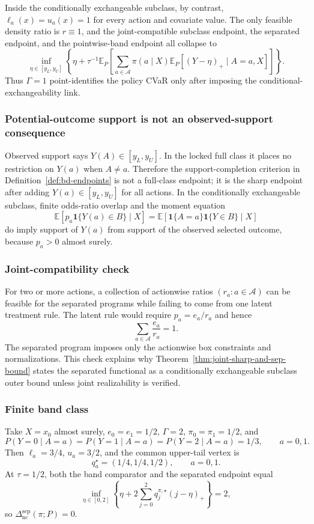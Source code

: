 \documentclass[11pt]{article}
\newcommand{\E}{\mathbb{E}}
\newcommand{\one}{\mathbf{1}}
\theoremstyle{definition}
\theoremstyle{plain}
\theoremstyle{remark}
\begin{document}
Inside the conditionally exchangeable subclass, by contrast,
\(\ell_a(x)=u_a(x)=1\) for every action and covariate value.  The only feasible
density ratio is \(r\equiv1\), and the joint-compatible subclass endpoint, the
separated endpoint, and the pointwise-band endpoint all collapse to
\[
\inf_{\eta\in[y_L,y_U]}
\left\{
\eta+\tau^{-1}
\E_P\left[
\sum_{a\in\mathcal A}\pi(a\mid X)
\E_P[(Y-\eta)_+\mid A=a,X]
\right]\right\}.
\]
Thus \(\Gamma=1\) point-identifies the policy CVaR only after imposing the
conditional-exchangeability link.

\subsubsection*{Potential-outcome support is not an observed-support consequence}
Observed support says \(Y(A)\in[y_L,y_U]\).  In the locked full class it places
no restriction on \(Y(a)\) when \(A\ne a\).  Therefore the support-completion
criterion in Definition~\ref{def:bd-endpoints} is not a full-class endpoint; it
is the sharp endpoint after adding
\(Y(a)\in[y_L,y_U]\) for all actions.  In the conditionally exchangeable
subclass, finite odds-ratio overlap and the moment equation
\[
\E[p_a\one\{Y(a)\in B\}\mid X]
=
\E[\one\{A=a\}\one\{Y\in B\}\mid X]
\]
do imply support of \(Y(a)\) from support of the observed selected outcome,
because \(p_a>0\) almost surely.

\subsubsection*{Joint-compatibility check}
For two or more actions, a collection of actionwise ratios
\((r_a:a\in\mathcal A)\) can be feasible for the separated programs while
failing to come from one latent treatment rule.  The latent rule would require
\(p_a=e_a/r_a\) and hence
\[
\sum_{a\in\mathcal A}\frac{e_a}{r_a}=1.
\]
The separated program imposes only the actionwise box constraints and
normalizations.  This check explains why
Theorem~\ref{thm:joint-sharp-and-sep-bound} states the separated functional as a
conditionally exchangeable subclass outer bound unless joint realizability is
verified.

\subsubsection*{Finite band class}
Take \(X=x_0\) almost surely, \(e_0=e_1=1/2\), \(\Gamma=2\),
\(\pi_0=\pi_1=1/2\), and
\[
P(Y=0\mid A=a)=P(Y=1\mid A=a)=P(Y=2\mid A=a)=1/3,\qquad a=0,1.
\]
Then \(\ell_a=3/4\), \(u_a=3/2\), and the common upper-tail vertex is
\[
q_a^\star=(1/4,1/4,1/2),\qquad a=0,1.
\]
At \(\tau=1/2\), both the band comparator and the separated endpoint equal
\[
\inf_{\eta\in[0,2]}
\left\{\eta+2\sum_{j=0}^2q^{\pi,\star}_j(j-\eta)_+\right\}
=2,
\]
so \(\Delta_{\mathrm{nc}}^{\mathrm{sep}}(\pi;P)=0\).
\end{document}
